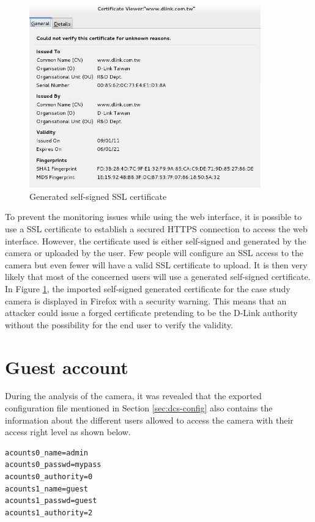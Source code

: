 \begin{figure}[h]
  \centering
  \includegraphics[width=10cm]{images/dcs-ssl.png}
  \caption{Generated self-signed SSL certificate}
  \label{fig:dcs-ssl}
\end{figure}

To prevent the monitoring issues while using the web interface, it is possible to use a SSL certificate to establish a secured HTTPS connection to access the web interface.
However, the certificate used is either self-signed and generated by the camera or uploaded by the user.
Few people will configure an SSL access to the camera but even fewer will have a valid SSL certificate to upload.
It is then very likely that most of the concerned users will use a generated self-signed certificate.\\

In Figure \ref{fig:dcs-ssl}, the imported self-signed generated certificate for the case study camera is displayed in Firefox with a security warning.
This means that an attacker could issue a forged certificate pretending to be the D-Link authority without the possibility for the end user to verify the validity.

\section{Guest account}
\label{sec:dcs-guest}

During the analysis of the camera, it was revealed that the exported configuration file mentioned in Section \ref{sec:dcs-config} also contains the information about the different users allowed to access the camera with their access right level as shown below.

{\scriptsize
\begin{verbatim}
acounts0_name=admin
acounts0_passwd=mypass
acounts0_authority=0
acounts1_name=guest
acounts1_passwd=guest
acounts1_authority=2
\end{verbatim}
}

